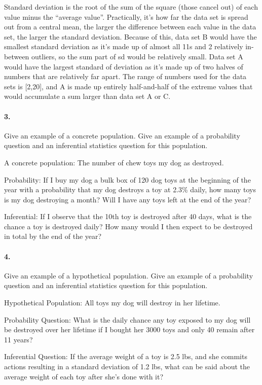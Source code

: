     \begin{mdframed}
        Standard deviation is the root of the sum of the square (those cancel out) of each value minus the ``average value''. Practically, it's how far the data set is spread out from a central mean, the larger the difference between each value in the data set, the larger the standard deviation. Because of this, data set B would have the smallest standard deviation as it's made up of almost all 11s and 2 relatively in-between outliers, so the sum part of sd would be relatively small. Data set A would have the largest standard of deviation as it's made up of two halves of numbers that are relatively far apart. The range of numbers used for the data sets is [2,20], and A is made up entirely half-and-half of the extreme values that would accumulate a sum larger than data set A or C.
    \end{mdframed}

    \paragraph*{3.}
    Give an example of a concrete population. Give an example of a probability question and an inferential statistics question for this population.

    \begin{mdframed}
        A concrete population: The number of chew toys my dog as destroyed.

        Probability: If I buy my dog a bulk box of 120 dog toys at the beginning of the year with a probability that my dog destroys a toy at 2.3\% daily, how many toys is my dog destroying a month? Will I have any toys left at the end of the year?

        Inferential: If I observe that the 10th toy is destroyed after 40 days, what is the chance a toy is destroyed daily? How many would I then expect to be destroyed in total by the end of the year?
    \end{mdframed}

    \paragraph*{4.}
    Give an example of a hypothetical population. Give an example of a probability question and an inferential statistics question for this population.

    \begin{mdframed}
        Hypothetical Population: All toys my dog will destroy in her lifetime.

        Probability Question: What is the daily chance any toy exposed to my dog will be destroyed over her lifetime if I bought her 3000 toys and only 40 remain after 11 years?

        Inferential Question: If the average weight of a toy is 2.5 lbs, and she commits actions resulting in a standard deviation of 1.2 lbs, what can be said about the average weight of each toy after she's done with it?
    \end{mdframed}

